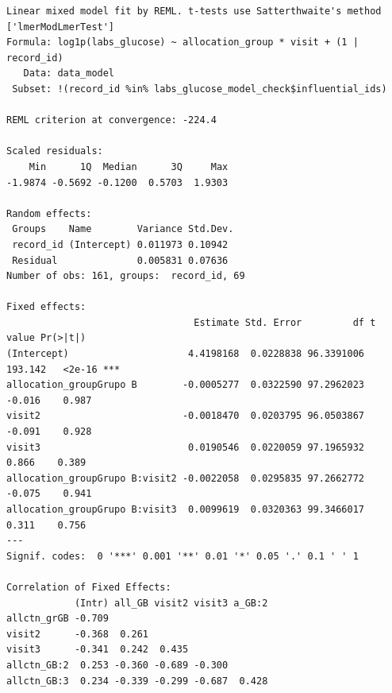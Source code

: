 \documentclass[
  12pt,
]{article}
\newenvironment{Shaded}{\begin{snugshade}}{\end{snugshade}}
\newcommand{\NormalTok}[1]{\textcolor[rgb]{0.00,0.23,0.31}{#1}}
\newcommand{\SpecialCharTok}[1]{\textcolor[rgb]{0.37,0.37,0.37}{#1}}
\begin{document}
\begin{verbatim}
Linear mixed model fit by REML. t-tests use Satterthwaite's method ['lmerModLmerTest']
Formula: log1p(labs_glucose) ~ allocation_group * visit + (1 | record_id)
   Data: data_model
 Subset: !(record_id %in% labs_glucose_model_check$influential_ids)

REML criterion at convergence: -224.4

Scaled residuals: 
    Min      1Q  Median      3Q     Max 
-1.9874 -0.5692 -0.1200  0.5703  1.9303 

Random effects:
 Groups    Name        Variance Std.Dev.
 record_id (Intercept) 0.011973 0.10942 
 Residual              0.005831 0.07636 
Number of obs: 161, groups:  record_id, 69

Fixed effects:
                                 Estimate Std. Error         df t value Pr(>|t|)    
(Intercept)                     4.4198168  0.0228838 96.3391006 193.142   <2e-16 ***
allocation_groupGrupo B        -0.0005277  0.0322590 97.2962023  -0.016    0.987    
visit2                         -0.0018470  0.0203795 96.0503867  -0.091    0.928    
visit3                          0.0190546  0.0220059 97.1965932   0.866    0.389    
allocation_groupGrupo B:visit2 -0.0022058  0.0295835 97.2662772  -0.075    0.941    
allocation_groupGrupo B:visit3  0.0099619  0.0320363 99.3466017   0.311    0.756    
---
Signif. codes:  0 '***' 0.001 '**' 0.01 '*' 0.05 '.' 0.1 ' ' 1

Correlation of Fixed Effects:
            (Intr) all_GB visit2 visit3 a_GB:2
allctn_grGB -0.709                            
visit2      -0.368  0.261                     
visit3      -0.341  0.242  0.435              
allctn_GB:2  0.253 -0.360 -0.689 -0.300       
allctn_GB:3  0.234 -0.339 -0.299 -0.687  0.428
\end{verbatim}

\begin{Shaded}
\end{Shaded}
\end{document}
